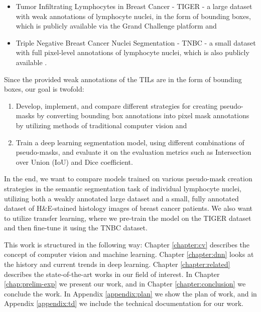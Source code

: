 \begin{itemize}
    \item Tumor Infiltrating Lymphocytes in Breast Cancer - TIGER - a large dataset with weak annotations of lymphocyte nuclei, in the form of bounding boxes, which is publicly available via the Grand Challenge platform \cite{tiger_dataset} and
    \item Triple Negative Breast Cancer Nuclei Segmentation - TNBC - a small dataset with full pixel-level annotations of lymphocyte nuclei, which is also publicly available \cite{TNBC-nuclei-seg}.
\end{itemize}

Since the provided weak annotations of the TILs are in the form of bounding boxes, our goal is twofold:

\begin{enumerate}
 \item Develop, implement, and compare different strategies for creating pseudo-masks by converting bounding box annotations into pixel mask annotations by utilizing methods of traditional computer vision and
 \item Train a deep learning segmentation model, using different combinations of pseudo-masks, and evaluate it on the evaluation metrics such as Intersection over Union (IoU) and Dice coefficient.
\end{enumerate}

In the end, we want to compare models trained on various pseudo-mask creation strategies in the semantic segmentation task of individual lymphocyte nuclei, utilizing both a weakly annotated large dataset and a small, fully annotated dataset of H\&E-stained histology images of breast cancer patients. We also want to utilize transfer learning, where we pre-train the model on the TIGER dataset and then fine-tune it using the TNBC dataset.

This work is structured in the following way: Chapter \ref{chapter:cv} describes the concept of computer vision and machine learning. Chapter \ref{chapter:dnn} looks at the history and current trends in deep learning. Chapter \ref{chapter:related} describes the state-of-the-art works in our field of interest. In Chapter \ref{chap:prelim-exp} we present our work, and in Chapter \ref{chapter:conclusion} we conclude the work. In Appendix \ref{appendix:plan} we show the plan of work, and in Appendix \ref{appendix:td} we include the technical documentation for our work.



